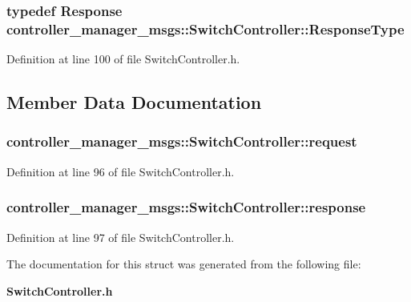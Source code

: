 \subsubsection[{\-Response\-Type}]{\setlength{\rightskip}{0pt plus 5cm}typedef {\bf \-Response} {\bf controller\-\_\-manager\-\_\-msgs\-::\-Switch\-Controller\-::\-Response\-Type}}\label{structcontroller__manager__msgs_1_1SwitchController_ae2eda6c04375b42ad1996e4e961bfcd6}


\-Definition at line 100 of file \-Switch\-Controller.\-h.



\subsection{\-Member \-Data \-Documentation}
\subsubsection[{request}]{ {\bf controller\-\_\-manager\-\_\-msgs\-::\-Switch\-Controller\-::request}}\label{structcontroller__manager__msgs_1_1SwitchController_ac3341b97624af56dac986404342999e4}


\-Definition at line 96 of file \-Switch\-Controller.\-h.

\subsubsection[{response}]{ {\bf controller\-\_\-manager\-\_\-msgs\-::\-Switch\-Controller\-::response}}\label{structcontroller__manager__msgs_1_1SwitchController_a3266e14c07be946c6365dc6024c7afd8}


\-Definition at line 97 of file \-Switch\-Controller.\-h.



\-The documentation for this struct was generated from the following file\-:\begin{DoxyCompactItemize}
\item 
{\bf \-Switch\-Controller.\-h}\end{DoxyCompactItemize}
